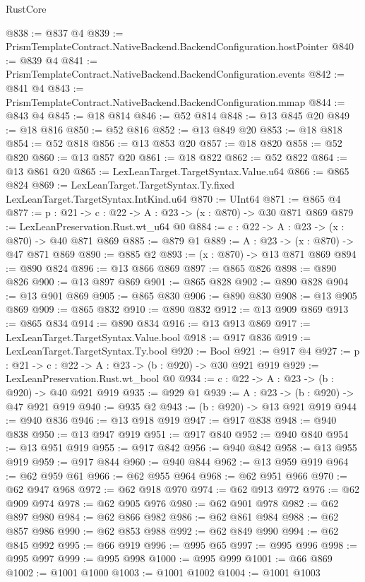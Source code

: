 \begin{lexlean}{RustCore}
\begin{coremodule}
@838 := @837 @4
@839 := PrismTemplateContract.NativeBackend.BackendConfiguration.hostPointer
@840 := @839 @4
@841 := PrismTemplateContract.NativeBackend.BackendConfiguration.events
@842 := @841 @4
@843 := PrismTemplateContract.NativeBackend.BackendConfiguration.mmap
@844 := @843 @4
@845 := @18 @814
@846 := @52 @814
@848 := @13 @845 @20
@849 := @18 @816
@850 := @52 @816
@852 := @13 @849 @20
@853 := @18 @818
@854 := @52 @818
@856 := @13 @853 @20
@857 := @18 @820
@858 := @52 @820
@860 := @13 @857 @20
@861 := @18 @822
@862 := @52 @822
@864 := @13 @861 @20
@865 := LexLeanTarget.TargetSyntax.Value.u64
@866 := @865 @824
@869 := LexLeanTarget.TargetSyntax.Ty.fixed LexLeanTarget.TargetSyntax.IntKind.u64
@870 := UInt64
@871 := @865 @4
@877 := {p : @21} -> {c : @22} -> {A : @23} -> (x : @870) -> @30 @871 @869
@879 := LexLeanPreservation.Rust.wt_u64 @0
@884 := {c : @22} -> {A : @23} -> (x : @870) -> @40 @871 @869
@885 := @879 @1
@889 := {A : @23} -> (x : @870) -> @47 @871 @869
@890 := @885 @2
@893 := (x : @870) -> @13 @871 @869
@894 := @890 @824
@896 := @13 @866 @869
@897 := @865 @826
@898 := @890 @826
@900 := @13 @897 @869
@901 := @865 @828
@902 := @890 @828
@904 := @13 @901 @869
@905 := @865 @830
@906 := @890 @830
@908 := @13 @905 @869
@909 := @865 @832
@910 := @890 @832
@912 := @13 @909 @869
@913 := @865 @834
@914 := @890 @834
@916 := @13 @913 @869
@917 := LexLeanTarget.TargetSyntax.Value.bool
@918 := @917 @836
@919 := LexLeanTarget.TargetSyntax.Ty.bool
@920 := Bool
@921 := @917 @4
@927 := {p : @21} -> {c : @22} -> {A : @23} -> (b : @920) -> @30 @921 @919
@929 := LexLeanPreservation.Rust.wt_bool @0
@934 := {c : @22} -> {A : @23} -> (b : @920) -> @40 @921 @919
@935 := @929 @1
@939 := {A : @23} -> (b : @920) -> @47 @921 @919
@940 := @935 @2
@943 := (b : @920) -> @13 @921 @919
@944 := @940 @836
@946 := @13 @918 @919
@947 := @917 @838
@948 := @940 @838
@950 := @13 @947 @919
@951 := @917 @840
@952 := @940 @840
@954 := @13 @951 @919
@955 := @917 @842
@956 := @940 @842
@958 := @13 @955 @919
@959 := @917 @844
@960 := @940 @844
@962 := @13 @959 @919
@964 := @62 @959 @61
@966 := @62 @955 @964
@968 := @62 @951 @966
@970 := @62 @947 @968
@972 := @62 @918 @970
@974 := @62 @913 @972
@976 := @62 @909 @974
@978 := @62 @905 @976
@980 := @62 @901 @978
@982 := @62 @897 @980
@984 := @62 @866 @982
@986 := @62 @861 @984
@988 := @62 @857 @986
@990 := @62 @853 @988
@992 := @62 @849 @990
@994 := @62 @845 @992
@995 := @66 @919
@996 := @995 @65
@997 := @995 @996
@998 := @995 @997
@999 := @995 @998
@1000 := @995 @999
@1001 := @66 @869
@1002 := @1001 @1000
@1003 := @1001 @1002
@1004 := @1001 @1003

\end{coremodule}
\end{lexlean}
